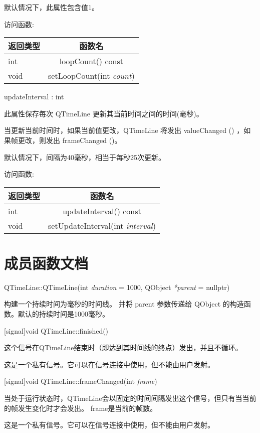 默认情况下，此属性包含值1。

访问函数:

\begin{tabular}{|l|c|}
\hline
返回类型	& 函数名 \\ 
\hline
int	&loopCount() const \\ 
\hline
void	&setLoopCount(int \emph{count}) \\
\hline
\end{tabular}

updateInterval : int

此属性保存每次 QTimeLine 更新其当前时间之间的时间(毫秒)。

当更新当前时间时，如果当前值更改，QTimeLine 将发出 valueChanged () ，如果帧更改，则发出 frameChanged ()。

默认情况下，间隔为40毫秒，相当于每秒25次更新。

访问函数:

\begin{tabular}{|l|c|}
\hline
返回类型	& 函数名 \\ 
\hline
int	 & updateInterval() const \\ 
\hline
void &	setUpdateInterval(int \emph{interval}) \\
\hline 
\end{tabular}

\section{成员函数文档}

QTimeLine::QTimeLine(int \emph{duration} = 1000, QObject \emph{*parent} = nullptr)

构建一个持续时间为毫秒的时间线。 并将 parent 参数传递给 QObject 的构造函数。默认的持续时间是1000毫秒。

[signal]void QTimeLine::finished()

这个信号在QTimeLine结束时（即达到其时间线的终点）发出，并且不循环。

\begin{notice}
这是一个私有信号。它可以在信号连接中使用，但不能由用户发射。
\end{notice}

[signal]void QTimeLine::frameChanged(int \emph{frame})

当处于运行状态时，QTimeLine会以固定的时间间隔发出这个信号，但只有当当前的帧发生变化时才会发出。 frame是当前的帧数。

\begin{notice}
这是一个私有信号。它可以在信号连接中使用，但不能由用户发射。
\end{notice}

